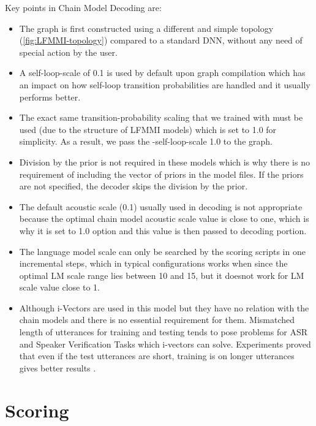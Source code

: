Key points in Chain Model Decoding are:
\begin{itemize}
    \item The graph is first constructed using a different and simple topology (\ref{fig:LFMMI-topology}) compared to a standard DNN, without any need of special action by the user. %
    \item A self-loop-scale of 0.1 is used by default upon graph compilation which has an impact on how self-loop transition probabilities are handled and it usually performs better. 
    \item The exact same transition-probability scaling that we trained with must be used (due to the structure of LFMMI models) which is set to 1.0 for simplicity. As a result, we pass the -self-loop-scale 1.0 to the graph. %
    \item Division by the prior is not required in these models which is why there is no requirement of including the vector of priors in the model files. If the priors are not specified, the decoder skips the division by the prior.
    \item The default acoustic scale (0.1) usually used in decoding is not appropriate because the optimal chain model acoustic scale value is close to one, which is why it is set to 1.0 option and this value is then passed to decoding portion.
    \item The language model scale can only be searched by the scoring scripts in one incremental steps, which in typical configurations works when since the optimal LM scale range lies between 10 and 15, but it doesnot work for LM scale value close to 1.
    \item Although i-Vectors are used in this model but they have no relation with the chain models and there is no essential requirement for them. Mismatched length of utterances for training and testing tends to pose problems for ASR and Speaker Verification Tasks which i-vectors can solve. Experiments proved that even if the test utterances are short, training is on longer utterances gives better results \cite{sarkar_study_2012}.
\end{itemize}

\section{Scoring}

